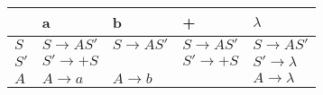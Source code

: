 {    \begin{table}[htbp]
        \centering
        \begin{tabularx}{\linewidth}{ | l | >{\RaggedRight\arraybackslash}X |
                        >{\RaggedRight\arraybackslash}X | >{\RaggedRight\arraybackslash}X |
                        >{\RaggedRight\arraybackslash}X | }
            \hline
                 & \textbf{a}          & \textbf{b}          & \textbf{+}          &
            $\lambda$                                                                               \\
            \hline
            $S$  & $S \to AS'$ & $S \to AS'$ & $S \to AS'$ & $S \to AS'$ \\
            \hline
            $S'$ & $S' \to +S$ &                     & $S' \to +S$ & $S' \to \lambda$ \\
            \hline
            $A$ & $A \to a$ & $A \to b$                    & &
            $A \to \lambda$ \\
            \hline
        \end{tabularx}
    \end{table}

}

